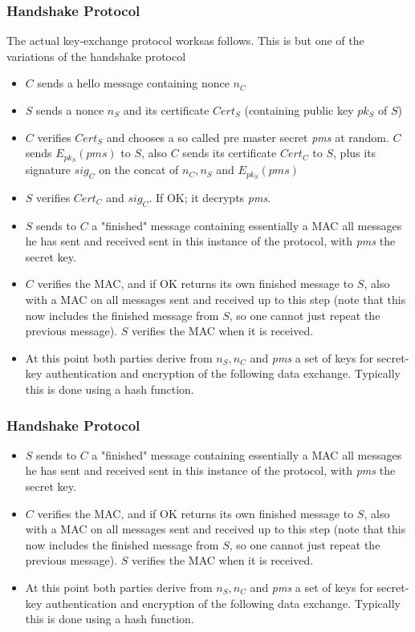                 \begin{frame}
                    \frametitle{Handshake Protocol}
                        The actual key-exchange protocol worksas follows. This is but one of the variations of the handshake protocol
                        \begin{itemize}
                            \item $C$ sends a hello message containing nonce $n_C$
                            \item $S$ sends a nonce $n_S$ and its certificate $Cert_S$ (containing public key $pk_S$ of $S$)
                            \item $C$ verifies $Cert_S$ and chooses a so called pre master secret \textit{pms} at random. $C$ sends $E_{pk_S}(pms)$ to $S$, also $C$ sends its certificate $Cert_C$ to $S$, plus its signature $sig_C$ on the concat of $n_C, n_S$ and $E_{pk_S}(pms)$
                            \item $S$ verifies $Cert_C$ and $sig_C$. If OK; it decrypts \textit{pms}. 
                            \item $S$ sends to $C$ a "finished" message containing essentially a MAC all messages he has sent and received sent in this instance of the protocol, with \textit{pms} the secret key.
                            \item $C$ verifies the MAC, and if OK returns its own finished message to $S$, also with a MAC on all messages sent and received up to this step (note that this now includes the finished message from $S$, so one cannot just repeat the previous message). $S$ verifies the MAC when it is received.
                            \item At this point both parties derive from $n_S,n_C$ and \textit{pms} a set of keys for secret-key authentication and encryption of the following data exchange. Typically this is done using a hash function.
                        \end{itemize}
                \end{frame}
            \begin{frame}
                \frametitle{Handshake Protocol}
                    \begin{itemize}
                        \item $S$ sends to $C$ a "finished" message containing essentially a MAC all messages he has sent and received sent in this instance of the protocol, with \textit{pms} the secret key.
                        \item $C$ verifies the MAC, and if OK returns its own finished message to $S$, also with a MAC on all messages sent and received up to this step (note that this now includes the finished message from $S$, so one cannot just repeat the previous message). $S$ verifies the MAC when it is received.
                        \item At this point both parties derive from $n_S,n_C$ and \textit{pms} a set of keys for secret-key authentication and encryption of the following data exchange. Typically this is done using a hash function.
                    \end{itemize}
            \end{frame}
